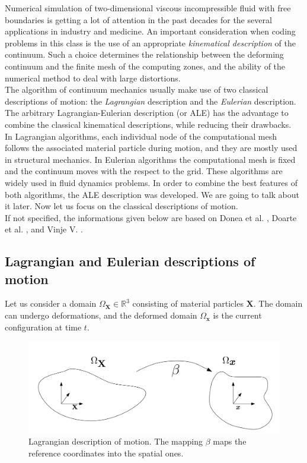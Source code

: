 \documentclass[a4paper,11pt,openright,twoside]{book}
\begin{document}
Numerical simulation of two-dimensional viscous incompressible fluid with free boundaries is getting a lot of attention in the past decades for the several applications in industry and medicine. An important consideration when coding problems in this class is the use of an appropriate \emph{kinematical description} of the continuum. Such a choice determines the relationship between the deforming continuum and the finite mesh of the computing zones, and the ability of the numerical method to deal with large distortions. \\
The algorithm of continuum mechanics usually make use of two classical descriptions of motion: the \emph{Lagrangian} description and the \emph{Eulerian} description. The arbitrary Lagrangian-Eulerian description (or ALE) has the advantage to combine the classical kinematical descriptions, while reducing their drawbacks. \\
In Lagrangian algorithms, each individual node of the computational mesh follows the associated material particle during motion, and they are mostly used in structural mechanics.
In Eulerian algorithms the computational mesh is fixed and the continuum moves with the respect to the grid. These algorithms are widely used in fluid dynamics problems.
In order to combine the best features of both algorithms, the ALE description was developed. We are going to talk about it later. Now let us focus on the classical descriptions of motion. \\
If not specified, the informations given below are based on Donea et al. \cite{donea}, Doarte et al. \cite{duarte}, and Vinje V. \cite{vegard}. 


\subsection{Lagrangian and Eulerian descriptions of motion}
Let us consider a domain $\Omega_{\mathbf{X}} \in \mathbb{R}^3$ consisting of material particles $\mathbf{X}$. The domain can undergo deformations, and the deformed domain $\Omega_\mathbf{x}$ is the current configuration at time $t$.

\begin{figure}[h!]
\centering
\includegraphics[width=\textwidth]{images/ALE1}
\caption{Lagrangian description of motion. The mapping $\beta$ maps the reference coordinates into the spatial ones.}
\end{figure}
\end{document}

